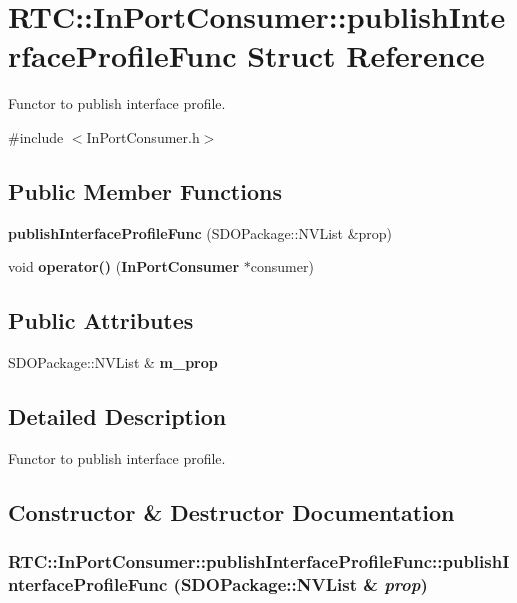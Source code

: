 \section{RTC::InPortConsumer::publishInterfaceProfileFunc Struct Reference}
\label{structRTC_1_1InPortConsumer_1_1publishInterfaceProfileFunc}


Functor to publish interface profile.  




{\ttfamily \#include $<$InPortConsumer.h$>$}

\subsection*{Public Member Functions}
\begin{DoxyCompactItemize}
\item 
{\bf publishInterfaceProfileFunc} (SDOPackage::NVList \&prop)
\item 
void {\bf operator()} ({\bf InPortConsumer} $\ast$consumer)
\end{DoxyCompactItemize}
\subsection*{Public Attributes}
\begin{DoxyCompactItemize}
\item 
SDOPackage::NVList \& {\bf m\_\-prop}
\end{DoxyCompactItemize}


\subsection{Detailed Description}
Functor to publish interface profile. 

\subsection{Constructor \& Destructor Documentation}
\subsubsection[{publishInterfaceProfileFunc}]{\setlength{\rightskip}{0pt plus 5cm}RTC::InPortConsumer::publishInterfaceProfileFunc::publishInterfaceProfileFunc (SDOPackage::NVList \& {\em prop})\hspace{0.3cm}{\ttfamily  [inline]}}\label{structRTC_1_1InPortConsumer_1_1publishInterfaceProfileFunc_a56ebfe2cf467594311e114fad2edd54c}


